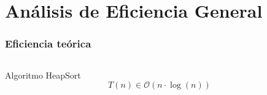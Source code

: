\documentclass[8pt, aspectratio=169]{beamer}
\begin{document}
    \section{Análisis de Eficiencia General}

    \begin{frame}
        \frametitle{Eficiencia teórica}
        



				


        \begin{columns}
            \begin{column}{0.4\textwidth}
                \begin{block}{Algoritmo HeapSort}
                    $$T(n) \in \mathcal{O}(n\cdot\log(n))$$
                \end{block}
            \end{column}


\end{columns}
\end{frame}
\end{document}
